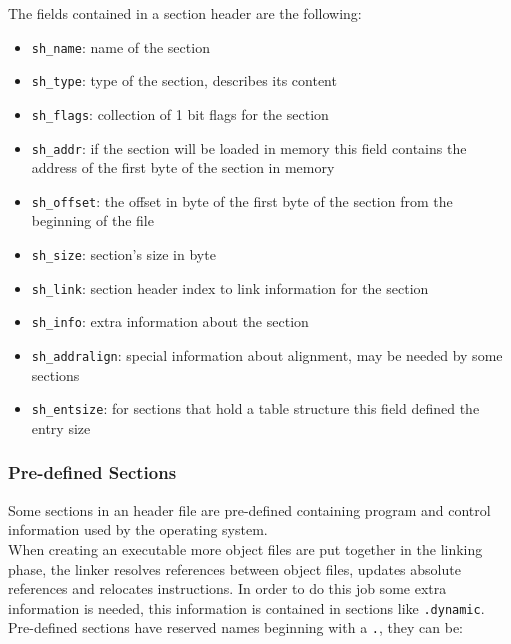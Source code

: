 The fields contained in a section header are the following:

\begin{itemize}
	\item \texttt{sh\_name}: name of the section
	\item \texttt{sh\_type}: type of the section, describes its content
	\item \texttt{sh\_flags}: collection of 1 bit flags for the section
	\item \texttt{sh\_addr}: if the section will be loaded in memory this field contains the address of the first byte of the section in memory
	\item \texttt{sh\_offset}: the offset in byte of the first byte of the section from the beginning of the file
	\item \texttt{sh\_size}: section's size in byte
	\item \texttt{sh\_link}: section header index to link information for the section
	\item \texttt{sh\_info}: extra information about the section
	\item \texttt{sh\_addralign}: special information about alignment, may be needed by some sections
	\item \texttt{sh\_entsize}: for sections that hold a table structure this field defined the entry size
\end{itemize}

\subsubsection{Pre-defined Sections}

Some sections in an header file are pre-defined containing program and control information used by the operating system.\\
When creating an executable more object files are put together in the linking phase, the linker resolves references between object files, updates absolute references and relocates instructions. In order to do this job some extra information is needed, this information is contained in sections like \texttt{.dynamic}.\\
Pre-defined sections have reserved names beginning with a \texttt{.}, they can be:

